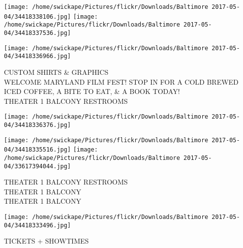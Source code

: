 \documentclass[10pt,letterpaper]{article}
\begin{document}
\texttt{[image: /home/swickape/Pictures/flickr/Downloads/Baltimore 2017-05-04/34418338106.jpg]}
\texttt{[image: /home/swickape/Pictures/flickr/Downloads/Baltimore 2017-05-04/34418337536.jpg]}

\vspace{0.25in}
\texttt{[image: /home/swickape/Pictures/flickr/Downloads/Baltimore 2017-05-04/34418336966.jpg]}

CUSTOM SHIRTS \& GRAPHICS\\
WELCOME MARYLAND FILM FEST!  STOP IN FOR A COLD BREWED ICED COFFEE, A BITE TO EAT, \& A BOOK TODAY!\\
THEATER 1 BALCONY RESTROOMS
\pagebreak

\texttt{[image: /home/swickape/Pictures/flickr/Downloads/Baltimore 2017-05-04/34418336376.jpg]}

\vspace{0.25in}
\texttt{[image: /home/swickape/Pictures/flickr/Downloads/Baltimore 2017-05-04/34418335516.jpg]}
\texttt{[image: /home/swickape/Pictures/flickr/Downloads/Baltimore 2017-05-04/33617394044.jpg]}

THEATER 1 BALCONY RESTROOMS\\
THEATER 1 BALCONY\\
THEATER 1 BALCONY
\pagebreak

\texttt{[image: /home/swickape/Pictures/flickr/Downloads/Baltimore 2017-05-04/34418333496.jpg]}

TICKETS + SHOWTIMES
\pagebreak
\end{document}
